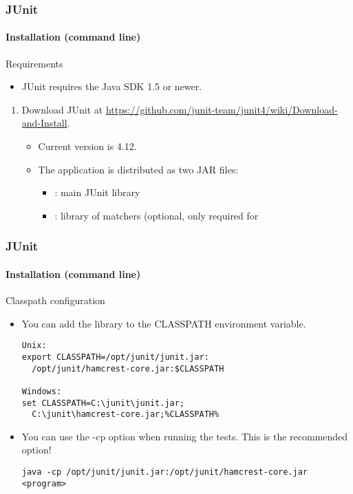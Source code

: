 \begin{frame}[parent={concept:junit}, hasprev=false, hasnext=true]
\frametitle{JUnit}
\framesubtitle{Installation (command line)}
\label{procedure:junit:installation:cmdline}


\begin{block:fact}{Requirements}
\begin{itemize}
	\item JUnit requires the Java SDK 1.5 or newer.
\end{itemize}
\end{block:fact}

\begin{block:procedure}{}
\begin{enumerate}
	\item Download JUnit at \url{https://github.com/junit-team/junit4/wiki/Download-and-Install}.
	\begin{itemize}
		\item Current version is 4.12.

		\item The application is distributed as two JAR files:
		\begin{itemize}
			\item {}: main JUnit library
			\item {}: library of matchers (optional, only required for 
		\end{itemize}
	\end{itemize}
\end{enumerate}
\end{block:procedure}
\end{frame}


\begin{frame}[fragile, hasprev=true, hasnext=true]
\frametitle{JUnit}
\framesubtitle{Installation (command line)}

\begin{block:fact}{Classpath configuration}
	\begin{itemize}
		\item You can add the library to the CLASSPATH environment variable.
\begin{lstlisting}
Unix:
export CLASSPATH=/opt/junit/junit.jar:
  /opt/junit/hamcrest-core.jar:$CLASSPATH
		
Windows:
set CLASSPATH=C:\junit\junit.jar;
  C:\junit\hamcrest-core.jar;%CLASSPATH%
\end{lstlisting}
		
		\item You can use the -cp option when running the tests. This is the
		recommended option!
\begin{lstlisting}
java -cp /opt/junit/junit.jar:/opt/junit/hamcrest-core.jar  <program>
\end{lstlisting}
	\end{itemize}
\end{block:fact}
\end{frame}



